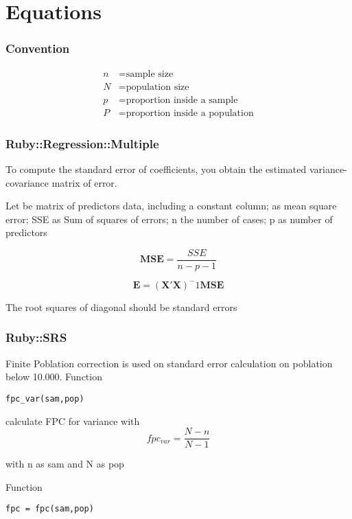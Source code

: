 \part{Equations}
\section{Convention}
\begin{align*}
n &= \text{sample size}\\
N &= \text{population size}\\
p &= \text{proportion inside a sample}\\
P &= \text{proportion inside a population}
\end{align*}
\section{Ruby::Regression::Multiple}

To compute the standard error of coefficients, you obtain the estimated variance-covariance matrix of error.

Let  be matrix of predictors data, including a constant column;  as mean square error; SSE as Sum of squares of errors; n the number of cases; p as number of predictors

\begin{equation}
\mathbf{MSE}=\frac{SSE}{n-p-1}
\end{equation}

\begin{equation}
\mathbf{E}=(\mathbf{X'}\mathbf{X})^-1\mathbf{MSE}
\end{equation}

The root squares of diagonal should be standard errors


\section{Ruby::SRS}
Finite Poblation correction is used on standard error calculation on poblation below 10.000. Function 
\begin{verbatim}
fpc_var(sam,pop)
\end{verbatim}
calculate FPC for variance with
\begin{equation}
fpc_{var} = \frac{N-n} {N-1}
\end{equation}

with n  as sam and N as pop

Function 
\begin{verbatim}
fpc = fpc(sam,pop)
\end{verbatim}


